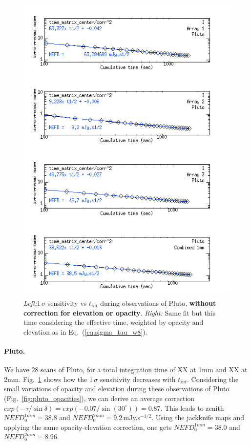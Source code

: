 \begin{figure}
\begin{center}
\includegraphics[clip, angle=0, scale=0.4]{Figures/Pluto_8_sigma_vs_time_matrix_center_tau_w8.png}
\caption{\emph{Left:}$1\,\sigma$ sensitivity vs $t_{int}$ during observations of Pluto, {\bf
  without correction for elevation or opacity}. \emph{Right:} Same fit but this
  time considering the effective time, weighted by opacity and elevation as in Eq.~(\ref{eq:sigma_tau_w8}).}
\label{fig:Pluto_8_sigma_vs_time_matrix_center}
\end{center}
\end{figure}

\paragraph{Pluto.} We have 28 scans of Pluto, for a total
integration time of XX at 1mm and XX at
2mm. Fig.~\ref{fig:Pluto_8_sigma_vs_time_matrix_center} shows how the
$1\,\sigma$ sensitivity decreases with $t_{int}$. Considering the small
variations of opacity and elevation during these observations of Pluto
(Fig.~\ref{fig:pluto_opacities}), we can derive an average correction
$exp(-\tau/\sin\delta) = exp(-0.07/\sin(30^\circ)) = 0.87$. This leads to zenith
$NEFD_0^{1mm} = 38.8$ and $NEFD_0^{2mm} = 9.2$\,mJy.s$^{-1/2}$. Using the
jackknife maps and applying the same opacity-elevation correction, one gets
$NEFD_0^{1mm}=38.0$ and $NEFD_0^{2mm}=8.96$.

